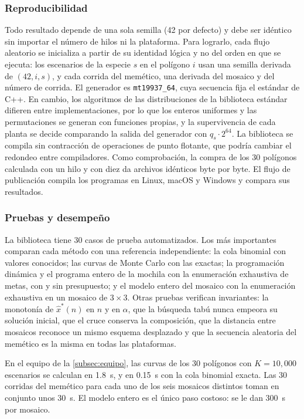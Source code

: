 \subsubsection{Reproducibilidad}
\label{subsec:impl-reproducibilidad}

Todo resultado depende de una sola semilla (42 por defecto) y debe ser idéntico sin importar el número de hilos ni la plataforma. Para lograrlo, cada flujo aleatorio se inicializa a partir de su identidad lógica y no del orden en que se ejecuta: los escenarios de la especie $s$ en el polígono $i$ usan una semilla derivada de $(42,i,s)$, y cada corrida del memético, una derivada del mosaico y del número de corrida. El generador es \texttt{mt19937\_64}, cuya secuencia fija el estándar de C++. En cambio, los algoritmos de las distribuciones de la biblioteca estándar difieren entre implementaciones, por lo que los enteros uniformes y las permutaciones se generan con funciones propias, y la supervivencia de cada planta se decide comparando la salida del generador con $q_s\cdot2^{64}$. La biblioteca se compila sin contracción de operaciones de punto flotante, que podría cambiar el redondeo entre compiladores. Como comprobación, la compra de los 30 polígonos calculada con un hilo y con diez da archivos idénticos byte por byte. El flujo de publicación compila los programas en Linux, macOS y Windows y compara sus resultados.

\subsubsection{Pruebas y desempeño}
\label{subsec:impl-pruebas}

La biblioteca tiene 30 casos de prueba automatizados. Los más importantes comparan cada método con una referencia independiente: la cola binomial con valores conocidos; las curvas de Monte Carlo con las exactas; la programación dinámica y el programa entero de la mochila con la enumeración exhaustiva de metas, con y sin presupuesto; y el modelo entero del mosaico con la enumeración exhaustiva en un mosaico de $3\times3$. Otras pruebas verifican invariantes: la monotonía de $\hat{x}^{*}(n)$ en $n$ y en $\alpha$, que la búsqueda tabú nunca empeora su solución inicial, que el cruce conserva la composición, que la distancia entre mosaicos reconoce un mismo esquema desplazado y que la secuencia aleatoria del memético es la misma en todas las plataformas.

En el equipo de la \cref{subsec:equipo}, las curvas de los 30 polígonos con $K=10{,}000$ escenarios se calculan en 1.8~s, y en 0.15~s con la cola binomial exacta. Las 30 corridas del memético para cada uno de los seis mosaicos distintos toman en conjunto unos 30~s. El modelo entero es el único paso costoso: se le dan 300~s por mosaico.
